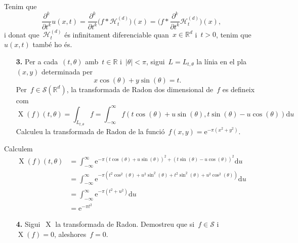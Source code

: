 \documentclass[a4paper]{article}
\theoremstyle{plain}
\theoremstyle{definition}
\DeclareMathOperator{\X}{X}
\newcommand{\e}{\mathrm{e}}
\providecommand{\uppi}{\pi}
\newcommand{\diff}{\mathrm{d}}
\newcommand{\abs}[1]{\lvert{#1}\rvert}
\newcommand{\Sc}{\mathcal{S}}
\newcommand{\Hk}{\mathcal{H}}
\newcommand{\RR}{\mathbb{R}}
\begin{document}
Tenim que
\[
    \frac{\partial^{k}}{\partial t^{k}}u(x,t)
    =
    \frac{\partial^{k}}{\partial t^{k}}
    \bigl(f\ast\Hk_{t}^{(d)}\bigr)(x)
    =
    \biggl(
        f\ast\frac{\partial^{k}}{\partial t^{k}}
        \Hk_{t}^{(d)}
    \biggr)(x),
\]
i donat que~\(\Hk_{t}^{(d)}\) és infinitament diferenciable quan~\(x\in\RR^{d}\)
i~\(t>0\), tenim que~\(u(x,t)\) també ho és.

\begin{enumerate}
    \item[\textbf{3.}] Per a cada~\((t,\theta)\) amb~\(t\in\RR\)
        i~\(\abs{\theta}<\uppi\), sigui~\(L=L_{t,\theta}\) la línia en el
        pla~\((x,y)\) determinada per
        \[
            x\cos(\theta) + y\sin(\theta) = t.
        \]
        Per~\(f\in\Sc(\RR^{d})\), la transformada de Radon dos dimensional
        de~\(f\) es defineix com
        \[
            \X(f)(t,\theta)
            =
            \int_{L_{t,\theta}}f
            =
            \int_{-\infty}^{\infty}
            f(t\cos(\theta) + u\sin(\theta), t\sin(\theta) - u\cos(\theta))
            \diff u
        \]
        Calculeu la transformada de Radon de la
        funció~\(f(x,y)=\e^{-\uppi(x^{2}+y^{2})}\).
\end{enumerate}

Calculem
\begin{align*}
    \X(f)(t,\theta) &= \int_{-\infty}^{\infty}
                       \e^{-\uppi
                           (t\cos(\theta) + u\sin(\theta))^{2}
                           +
                           (t\sin(\theta) - u\cos(\theta))^{2}}
                       \diff u \\
                    &= \int_{-\infty}^{\infty}
                       \e^{-\uppi
                           (t^{2}\cos^{2}(\theta) + u^{2}\sin^{2}(\theta)
                           +
                           t^{2}\sin^{2}(\theta) + u^{2}\cos^{2}(\theta))}
                       \diff u \\
                    &= \int_{-\infty}^{\infty}
                       \e^{-\uppi(t^{2} + u^{2})}
                       \diff u \\
                    &= \e^{-\uppi t^{2}}
\end{align*}

\begin{enumerate}
    \item[\textbf{4.}] Sigui~\(\X\) la transformada de Radon. Demostreu que
        si~\(f\in\Sc\) i~\(\X(f)=0\), aleshores~\(f=0\).
\end{enumerate}
\end{document}
